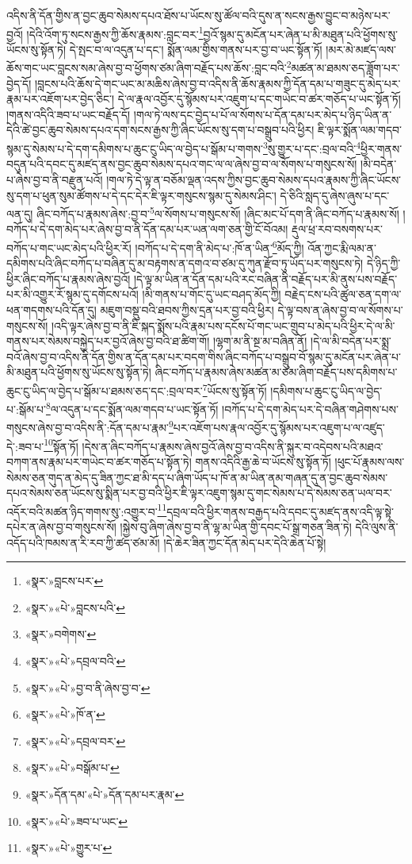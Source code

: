 འདིས་ནི་དོན་གྱིས་ན་བྱང་ཆུབ་སེམས་དཔའ་ཐོས་པ་ཡོངས་སུ་ཚོལ་བའི་དུས་ན་སངས་རྒྱས་བྱུང་བ་མཉེས་པར་བྱའོ། །དེའི་འོག་ཏུ་སངས་རྒྱས་ཀྱི་ཆོས་རྣམས་:བླང་བར་\footnote{«སྣར་»བླངས་པར་}བྱའོ་སྙམ་དུ་མངོན་པར་ཞེན་པ་མི་མཐུན་པའི་ཕྱོགས་སུ་ཡོངས་སུ་སྟོན་ཏེ། དེ་སྤང་བ་ལ་འདུན་པ་དང་། སྨོན་ལམ་གྱིས་གནས་པར་བྱ་བ་ཡང་སྟོན་ཏོ། །མར་མེ་མཛད་ལས་ཆོས་གང་ཡང་བླངས་སམ་ཞེས་བྱ་བ་ཕྱོགས་ཙམ་ཞིག་བརྗོད་པས་ཆོས་:བླང་བའི་\footnote{«སྣར་»«པེ་»བླངས་པའི་}མཚན་མ་ཐམས་ཅད་ཟློག་པར་བྱེད་དོ། །བླངས་པའི་ཆོས་དེ་གང་ཡང་མ་མཆིས་ཞེས་བྱ་བ་འདིས་ནི་ཆོས་རྣམས་ཀྱི་དོན་དམ་པ་གཟུང་དུ་མེད་པར་རྣམ་པར་འཇོག་པར་བྱེད་ཅིང་། དེ་ལ་རྣལ་འབྱོར་དུ་སྙོམས་པར་འཇུག་པ་དང་གཡེང་བ་ཚར་གཅོད་པ་ཡང་སྟོན་ཏོ། །གནས་འདིའི་ཟབ་པ་ཡང་བརྗོད་དོ། །གལ་ཏེ་ལས་དང་བྱེད་པ་པོ་ལ་སོགས་པ་དོན་དམ་པར་མེད་པ་ཉིད་ཡིན་ན་དེའི་ཚེ་བྱང་ཆུབ་སེམས་དཔའ་དག་སངས་རྒྱས་ཀྱི་ཞིང་ཡོངས་སུ་དག་པ་བསྒྲུབ་པའི་ཕྱིར། ཇི་ལྟར་སྨོན་ལམ་གདབ་སྙམ་དུ་སེམས་པ་དེ་དག་དམིགས་པ་ཆུང་ངུ་ཡིད་ལ་བྱེད་པ་སྒོམ་པ་གགས་\footnote{«སྣར་»བགེགས་}སུ་གྱུར་པ་དང་:བྲལ་བའི་\footnote{«སྣར་»«པེ་»དབྲལ་བའི་}ཕྱིར་གནས་བདུན་པའི་དབང་དུ་མཛད་ནས་བྱང་ཆུབ་སེམས་དཔའ་གང་ལ་ལ་ཞེས་བྱ་བ་ལ་སོགས་པ་གསུངས་སོ། །མི་བདེན་པ་ཞེས་བྱ་བ་ནི་བརྫུན་པའོ། །གལ་ཏེ་དེ་ལྟ་ན་བཅོམ་ལྡན་འདས་ཀྱིས་བྱང་ཆུབ་སེམས་དཔའ་རྣམས་ཀྱི་ཞིང་ཡོངས་སུ་དག་པ་ཕུན་སུམ་ཚོགས་པ་དེ་དང་དེར་ཇི་ལྟར་གསུངས་སྙམ་དུ་སེམས་ཤིང་། དེ་ཅིའི་སླད་དུ་ཞེས་ཞུས་པ་དང་ལན་དུ། ཞིང་བཀོད་པ་རྣམས་ཞེས་:བྱ་བ་\footnote{«སྣར་»«པེ་»བྱ་བ་ནི་ཞེས་བྱ་བ་}ལ་སོགས་པ་གསུངས་སོ། །ཞིང་མང་པོ་དག་ནི་ཞིང་བཀོད་པ་རྣམས་སོ། །བཀོད་པ་དེ་དག་མེད་པར་ཞེས་བྱ་བ་ནི་དོན་དམ་པར་ཡན་ལག་ཅན་གྱི་ངོ་བོའམ། རྡུལ་ཕྲ་རབ་བསགས་པར་བཀོད་པ་གང་ཡང་མེད་པའི་ཕྱིར་རོ། །བཀོད་པ་དེ་དག་ནི་མེད་པ་:ཁོ་ན་ཡིན་\footnote{«སྣར་»«པེ་»ཁོ་ན་}མོད་ཀྱི། འོན་ཀྱང་རྨི་ལམ་ན་དམིགས་པའི་ཞིང་བཀོད་པ་བཞིན་དུ་མ་བརྟགས་ན་དགའ་བ་ཙམ་དུ་ཀུན་རྫོབ་ཏུ་ཡོད་པར་གསུངས་ཏེ། དེ་ཉིད་ཀྱི་ཕྱིར་ཞིང་བཀོད་པ་རྣམས་ཞེས་བྱའོ། །དེ་ལྟ་མ་ཡིན་ན་དོན་དམ་པའི་རང་བཞིན་ནི་བརྗོད་པར་མི་ནུས་པས་བརྗོད་པར་མི་འགྱུར་རོ་སྙམ་དུ་དགོངས་པའོ། །མི་གནས་པ་གོང་དུ་ཡང་བཤད་མོད་ཀྱི། བརྗེད་ངས་པའི་ཚུལ་ཅན་དག་ལ་ཕན་གདགས་པའི་དོན་དུ། མཇུག་བསྡུ་བའི་ཐབས་ཀྱིས་དྲན་པར་བྱ་བའི་ཕྱིར། དེ་ལྟ་བས་ན་ཞེས་བྱ་བ་ལ་སོགས་པ་གསུངས་སོ། །འདི་ལྟར་ཞེས་བྱ་བ་ནི་ཇི་སྐད་སྨོས་པའི་རྣམ་པས་དངོས་པོ་གང་ཡང་གྲུབ་པ་མེད་པའི་ཕྱིར་དེ་ལ་མི་གནས་པར་སེམས་བསྐྱེད་པར་བྱའོ་ཞེས་བྱ་བའི་ཐ་ཚིག་གོ། །ལྷག་མ་ནི་སྔ་མ་བཞིན་ནོ། །དེ་ལ་མི་བདེན་པར་སྨྲ་བའོ་ཞེས་བྱ་བ་འདིས་ནི་དོན་གྱིས་ན་དོན་དམ་པར་བདག་གིས་ཞིང་བཀོད་པ་བསྒྲུབ་བོ་སྙམ་དུ་མངོན་པར་ཞེན་པ་མི་མཐུན་པའི་ཕྱོགས་སུ་ཡོངས་སུ་སྟོན་ཏེ། ཞིང་བཀོད་པ་རྣམས་ཞེས་མཚན་མ་ཙམ་ཞིག་བརྗོད་པས་དམིགས་པ་ཆུང་ངུ་ཡིད་ལ་བྱེད་པ་སྒོམ་པ་ཐམས་ཅད་དང་:བྲལ་བར་\footnote{«སྣར་»«པེ་»དབྲལ་བར་}ཡོངས་སུ་སྟོན་ཏོ། །དམིགས་པ་ཆུང་ངུ་ཡིད་ལ་བྱེད་པ་:སྒོམ་པ་\footnote{«སྣར་»«པེ་»བསྒོམ་པ་}ལ་འདུན་པ་དང་སྨོན་ལམ་གདབ་པ་ཡང་སྟོན་ཏོ། །བཀོད་པ་དེ་དག་མེད་པར་དེ་བཞིན་གཤེགས་པས་གསུངས་ཞེས་བྱ་བ་འདིས་ནི་:དོན་དམ་པ་རྣམ་\footnote{«སྣར་»དོན་དམ་«པེ་»དོན་དམ་པར་རྣམ་}པར་འཇོག་པས་རྣལ་འབྱོར་དུ་སྙོམས་པར་འཇུག་པ་ལ་འཛུད་དེ་:ཟབ་པ་\footnote{«སྣར་»«པེ་»ཟབ་པ་ཡང་}སྟོན་ཏོ། །དེས་ན་ཞིང་བཀོད་པ་རྣམས་ཞེས་བྱའོ་ཞེས་བྱ་བ་འདིས་ནི་སྐུར་བ་འདེབས་པའི་མཐའ་བཀག་ནས་རྣམ་པར་གཡེང་བ་ཚར་གཅོད་པ་སྟོན་ཏེ། གནས་འདིའི་རྒྱ་ཆེ་བ་ཡོངས་སུ་སྟོན་ཏོ། །ཕུང་པོ་རྣམས་ལས་སེམས་ཅན་གུད་ན་མེད་དུ་ཟིན་ཀྱང་ཐ་མི་དད་པ་ཞིག་ཡོད་པ་ཁོ་ན་མ་ཡིན་ནམ་གཞན་དུ་ན་བྱང་ཆུབ་སེམས་དཔའ་སེམས་ཅན་ཡོངས་སུ་སྨིན་པར་བྱ་བའི་ཕྱིར་ཇི་ལྟར་འཇུག་སྙམ་དུ་གང་སེམས་པ་དེ་སེམས་ཅན་ཡལ་བར་འདོར་བའི་མཚན་ཉིད་གགས་སུ་:འགྱུར་བ་\footnote{«སྣར་»«པེ་»གྱུར་པ་}དབྲལ་བའི་ཕྱིར་གནས་བརྒྱད་པའི་དབང་དུ་མཛད་ནས་འདི་ལྟ་སྟེ་དཔེར་ན་ཞེས་བྱ་བ་གསུངས་སོ། །སྐྱེས་བུ་ཞིག་ཞེས་བྱ་བ་ནི་ལྷ་མ་ཡིན་གྱི་དབང་པོ་སྒྲ་གཅན་ཟིན་ཏེ། དེའི་ལུས་ནི་འདོད་པའི་ཁམས་ན་རི་རབ་ཀྱི་ཚད་ཙམ་མོ། །དེ་ཆེར་ཟིན་ཀྱང་དོན་མེད་པར་དེའི་ཆེན་པོ་སྟེ། 